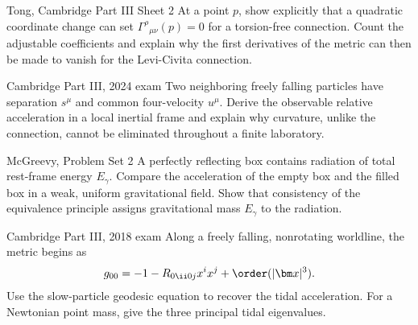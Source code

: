 \begin{exercises}
\begin{exercise}{Tong, Cambridge Part III Sheet 2}
At a point \(p\), show explicitly that a quadratic coordinate change can set
\(\Gamma^\rho{}_{\mu\nu}(p)=0\) for a torsion-free connection.  Count the
adjustable coefficients and explain why the first derivatives of the metric
can then be made to vanish for the Levi-Civita connection.
\end{exercise}

\begin{exercise}{Cambridge Part III, 2024 exam}
Two neighboring freely falling particles have separation \(s^\mu\) and common
four-velocity \(u^\mu\).  Derive the observable relative acceleration in a
local inertial frame and explain why curvature, unlike the connection, cannot
be eliminated throughout a finite laboratory.
\end{exercise}

\begin{exercise}{McGreevy, Problem Set 2}
A perfectly reflecting box contains radiation of total rest-frame energy
\(E_\gamma\).  Compare the acceleration of the empty box and the filled box in
a weak, uniform gravitational field.  Show that consistency of the
equivalence principle assigns gravitational mass \(E_\gamma\) to the
radiation.
\end{exercise}

\begin{exercise}{Cambridge Part III, 2018 exam}
Along a freely falling, nonrotating worldline, the metric begins as
\[
g_{00}=-1-R_{0\ii0j}x^ix^j+\order(|\bm x|^3).
\]
Use the slow-particle geodesic equation to recover the tidal acceleration.
For a Newtonian point mass, give the three principal tidal eigenvalues.
\end{exercise}



\end{exercises}

